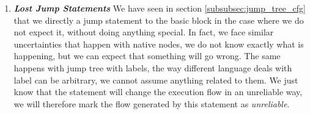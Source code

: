 \begin{enumerate}
	\item \textbf{\textit{Lost Jump Statements}} \newline 
	\label{subsubsec:lost_jump_statement}
	We have seen in section \ref{subsubsec:jump_tree_cfg} that we directly a jump statement to the basic block in the case where we do not expect it, without doing anything special.
	In fact, we face similar uncertainties that happen with native nodes, we do not know exactly what is happening, but we can expect that something will go wrong.
	The same happens with jump tree with labels, the way different language deals with label can be arbitrary, we cannot assume anything related to them.
	We just know that the statement will change the execution flow in an unreliable way, we will therefore mark the flow generated by this statement as \emph{unreliable}.
\end{enumerate}
